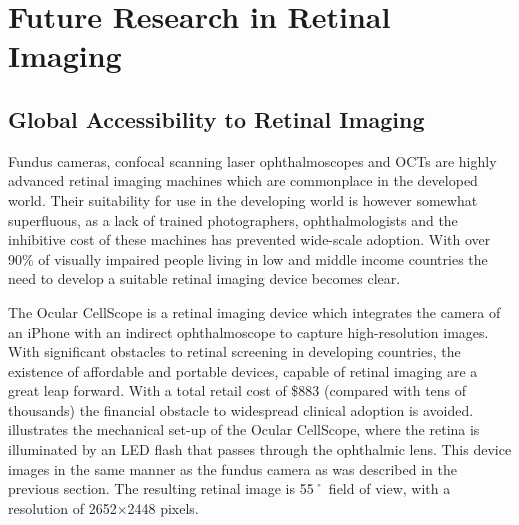 
\chapter{Future Research in Retinal Imaging}

\label{future_research}


\section {Global Accessibility to Retinal Imaging}

Fundus cameras, confocal scanning laser ophthalmoscopes and OCTs are
highly advanced retinal imaging machines which are commonplace in the
developed world. Their suitability for use in the developing world is
however somewhat superfluous, as a lack of trained photographers,
ophthalmologists and the inhibitive cost of these machines has prevented
wide-scale adoption. With over 90\% of visually impaired people living
in low and middle income countries the need to develop a suitable
retinal imaging device becomes clear.\cite{burgess2013diabetic} 

The Ocular CellScope is a retinal imaging device which integrates the
camera of an iPhone with an indirect ophthalmoscope to capture
high-resolution images. With significant obstacles to retinal screening
in developing countries, the existence of affordable and portable devices,
capable of retinal imaging are a great leap forward. With a total retail
cost of \$883 (compared with tens of thousands) the financial obstacle
to widespread clinical adoption is avoided.  illustrates
the mechanical set-up of the Ocular CellScope, where the retina is
illuminated by an LED flash that passes through the ophthalmic lens.
This device images in the same manner as the fundus camera as was described
in the previous section. The resulting retinal image is 55˚ field of view,
with a resolution of 2652×2448 pixels. \cite{medscape}
%


